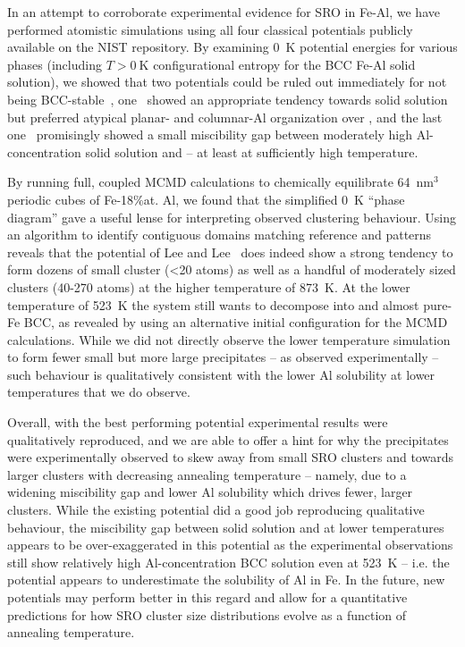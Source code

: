 In an attempt to corroborate experimental evidence for SRO in Fe-Al, we have performed atomistic simulations using all four classical potentials publicly available on the NIST repository.
By examining 0~K potential energies for various phases (including $T>0~\mathrm{K}$ configurational entropy for the BCC Fe-Al solid solution), we showed that two potentials could be ruled out immediately for not being BCC-stable~\cite{farkas2020model, jelinek2012modified}, one~\cite{mendelev2005effect} showed an appropriate tendency towards solid solution but preferred atypical planar- and columnar-Al organization over \DOTHREE, and the last one~\cite{lee2010modified} promisingly showed a small miscibility gap between moderately high Al-concentration solid solution and \DOTHREE -- at least at sufficiently high temperature.

By running full, coupled MCMD calculations to chemically equilibrate 64~$\mathrm{nm}^3$ periodic cubes of Fe-18\%at. Al, we found that the simplified 0~K ``phase diagram'' gave a useful lense for interpreting observed clustering behaviour.
Using an algorithm to identify contiguous domains matching reference \DOTHREE and \BTWO patterns reveals that the potential of Lee and Lee~\cite{lee2010modified} does indeed show a strong tendency to form dozens of small cluster (<20 atoms) as well as a handful of moderately sized clusters (40-270 atoms) at the higher temperature of 873~K.
At the lower temperature of 523~K the system still wants to decompose into \DOTHREE and almost pure-Fe BCC, as revealed by using an alternative initial configuration for the MCMD calculations.
While we did not directly observe the lower temperature simulation to form fewer small but more large precipitates -- as observed experimentally -- such behaviour is qualitatively consistent with the lower Al solubility at lower temperatures that we do observe.

Overall, with the best performing potential experimental results were qualitatively reproduced, and we are able to offer a hint for why the \DOTHREE precipitates were experimentally observed to skew away from small SRO clusters and towards larger clusters with decreasing annealing temperature -- namely, due to a widening miscibility gap and lower Al solubility which drives fewer, larger clusters.
While the existing potential did a good job reproducing qualitative behaviour, the miscibility gap between solid solution and \DOTHREE at lower temperatures appears to be over-exaggerated in this potential as the experimental observations still show relatively high Al-concentration BCC solution even at 523~K -- i.e. the potential appears to underestimate the solubility of Al in Fe.
In the future, new potentials may perform better in this regard and allow for a quantitative predictions for how SRO cluster size distributions evolve as a function of annealing temperature.
